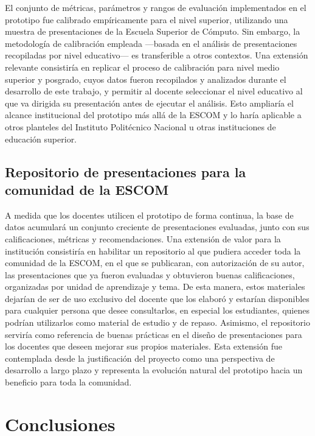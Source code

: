 \documentclass[11pt]{article}
\begin{document}
El conjunto de métricas, parámetros y rangos de evaluación implementados en el prototipo fue calibrado empíricamente para el nivel superior, utilizando una muestra de presentaciones de la Escuela Superior de Cómputo. Sin embargo, la metodología de calibración empleada —basada en el análisis de presentaciones recopiladas por nivel educativo— es transferible a otros contextos. Una extensión relevante consistiría en replicar el proceso de calibración para nivel medio superior y posgrado, cuyos datos fueron recopilados y analizados durante el desarrollo de este trabajo, y permitir al docente seleccionar el nivel educativo al que va dirigida su presentación antes de ejecutar el análisis. Esto ampliaría el alcance institucional del prototipo más allá de la ESCOM y lo haría aplicable a otros planteles del Instituto Politécnico Nacional u otras instituciones de educación superior.

\subsection*{Repositorio de presentaciones para la comunidad de la ESCOM}

A medida que los docentes utilicen el prototipo de forma continua, la base de datos acumulará un conjunto creciente de presentaciones evaluadas, junto con sus calificaciones, métricas y recomendaciones. Una extensión de valor para la institución consistiría en habilitar un repositorio al que pudiera acceder toda la comunidad de la ESCOM, en el que se publicaran, con autorización de su autor, las presentaciones que ya fueron evaluadas y obtuvieron buenas calificaciones, organizadas por unidad de aprendizaje y tema. De esta manera, estos materiales dejarían de ser de uso exclusivo del docente que los elaboró y estarían disponibles para cualquier persona que desee consultarlos, en especial los estudiantes, quienes podrían utilizarlos como material de estudio y de repaso. Asimismo, el repositorio serviría como referencia de buenas prácticas en el diseño de presentaciones para los docentes que deseen mejorar sus propios materiales. Esta extensión fue contemplada desde la justificación del proyecto como una perspectiva de desarrollo a largo plazo y representa la evolución natural del prototipo hacia un beneficio para toda la comunidad.
\clearpage
\section*{Conclusiones}
\end{document}
